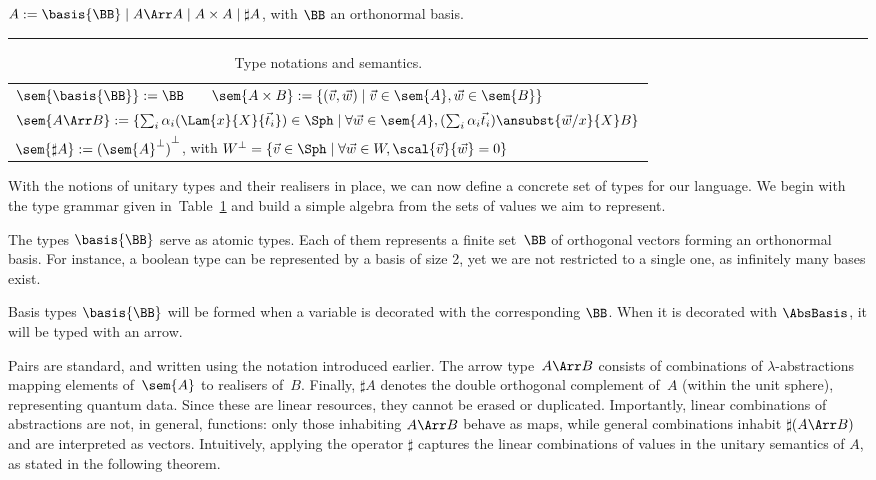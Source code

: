\begin{table}[t]
  \centering
  $A := \basis{\BB} \mid A\Arr A \mid A\times A \mid \sharp A$, with $\BB$ an orthonormal basis.
  \vspace{2pt}
  \hrule
  \vspace{4pt}
  \begin{tabular}{l}
    $\sem{\basis{\BB}}:= \BB \qquad \sem{A\times B}:= \{(\vec v, \vec w) \mid \vec v\in\sem{A}, \vec w\in\sem{B}\}$ \\
    $\sem{A\Arr B}:= \{\sum_i \alpha_i(\Lam{x}{X}{\vec{t}_{i}})\in\Sph \mid \forall\vec{w}\in\sem{A}, (\sum_i \alpha_i \vec{t}_{i})\ansubst{\vec{w}/x}{X}\real B\}$ \\
    $\sem{\sharp A}:= {(\sem{A}^\bot)}^\bot$, with $W^\bot = \{\vec{v}\in\Sph \mid \forall \vec{w}\in W, \scal{\vec{v}}{\vec{w}} = 0\}$
  \end{tabular}
  \caption{Type notations and semantics.}
  \label{tab:UnitaryTypes}
\end{table}
With the notions of unitary types and their realisers in place, we can now
define a concrete set of types for our language. We begin with the type grammar
given in~Table~\ref{tab:UnitaryTypes} and build a simple algebra from the sets of
values we aim to represent.

The types $\basis{\BB}$ serve as atomic types. Each of them represents a finite
set~$\BB$ of orthogonal vectors forming an orthonormal basis. For instance, a
boolean type can be represented by a basis of size 2, yet we are not restricted
to a single one, as infinitely many bases exist. 

Basis types $\basis{\BB}$ will be formed when a variable is decorated with the
corresponding $\BB$. When it is decorated with $\AbsBasis$, it will be
typed with an arrow.

Pairs are standard, and written using the notation introduced earlier.
The arrow type~$A\Arr B$ consists of combinations of $\lambda$-abstractions
mapping elements of~$\sem{A}$ to realisers of~$B$.  
Finally, $\sharp A$ denotes the double orthogonal complement of~$A$ (within the unit sphere),
representing quantum data. Since these are linear resources, they cannot be erased or
duplicated.
Importantly, linear combinations of abstractions are not, in general, functions:
only those inhabiting $A \Arr B$ behave as maps, while general combinations
inhabit $\sharp(A \Arr B)$ and are interpreted as vectors.
Intuitively, applying the operator $\sharp$ captures the
linear combinations of values in the unitary semantics of $A$, as 
stated in the following theorem.

